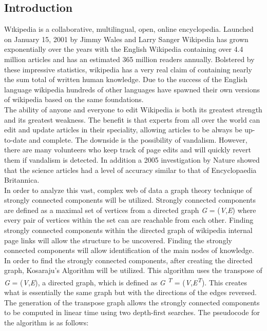 \documentclass[twoside]{article}
\begin{document}
\begin{multicols}{2} %

\section{Introduction}

\lettrine[nindent=0em,lines=3]{W} ikipedia is a collaborative, multilingual, open, online 
encyclopedia. Launched on January 15, 2001 by Jimmy Wales and Larry Sanger 
Wikipedia has grown exponentially over the years with the English Wikipedia containing 
over 4.4 million articles and has an estimated 365 million readers annually. \cite{Wikipedia}
Bolstered by these impressive statistics, wikipedia has a very real claim of containing 
nearly the sum total of written human knowledge. Due to the success of the English language
wikipedia hundreds of other languages have spawned their own versions of wikipedia
based on the same foundations.\\

The ability of anyone and everyone to edit Wikipedia is both its greatest strength
and its greatest weakness. The benefit is that experts from all over the world can
edit and update articles in their speciality, allowing articles to be always be up-to-date 
and complete. The downside is the possibility of vandalism. However, there are many
volunteers who keep track of page edits and will quickly revert them if vandalism is 
detected. In addition a 2005 investigation by Nature showed that the science articles 
had a level of accuracy similar to that of Encyclopaedia Britannica. \cite{Nature}\\

In order to analyze this vast, complex web of data a graph theory technique of
strongly connected components will be utilized. Strongly connected components are
defined as a maximal set of vertices from a directed graph {\it  G} = ({\it  V},{\it E})
where every pair of vertices within the set can are reachable from each other. \cite{Cormen}
Finding strongly connected components within the
directed graph of wikipedia internal page links will allow the structure to be 
uncovered. Finding the strongly connected components will allow identification of
the main nodes of knowledge.\\

In order to find the strongly connected components, after creating the directed graph,
Kosaraju's Algorithm will be utilized. This algorithm uses the transpose of {\it  G} = ({\it  V},{\it E}),
a directed graph, which is defined as {\it  G \textsuperscript{T}} = ({\it  V},{\it E\textsuperscript{T}}). 
This creates what is essentially the same graph but with the directions of the edges reversed.
The generation of the transpose graph allows the strongly connected components
to be computed in linear time using two depth-first searches. The pseudocode for 
the algorithm is as follows: \cite{Cormen}\\


\end{multicols}
\end{document}
